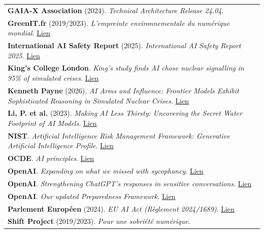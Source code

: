 \documentclass[
  10pt,
  a4paper,
  DIV=11,
  numbers=noendperiod,
  oneside]{scrreprt}
\let\oldtextbf\textbf
\renewcommand{\textbf}[1]{\oldtextbf{\textcolor{cmmnavy}{#1}}}
\let\oldemph\emph
\renewcommand{\emph}[1]{\oldemph{\textcolor{cmmgray}{#1}}}
\begin{document}
{\begin{longtable}[]{@{}
  >{\raggedright\arraybackslash}p{}@{}}
\textbf{GAIA-X Association} (2024). \emph{Technical Architecture Release
24.04}. \\
\textbf{GreenIT.fr} (2019/2023). \emph{L'empreinte environnementale du
numérique mondial}.
\href{https://www.greenit.fr/etude-empreinte-environnementale-du-numerique-mondial/}{Lien} \\
\textbf{International AI Safety Report} (2025). \emph{International AI
Safety Report 2025}.
\href{https://internationalaisafetyreport.org/publication/international-ai-safety-report-2025}{Lien} \\
\textbf{King's College London}. \emph{King's study finds AI chose
nuclear signalling in 95\% of simulated crises}.
\href{https://www.kcl.ac.uk/news/artificial-intelligence-under-nuclear-pressure-first-large-scale-kings-study-reveals-how-ai-models-reason-and-escalate-under-crisis}{Lien} \\
\textbf{Kenneth Payne} (2026). \emph{AI Arms and Influence: Frontier
Models Exhibit Sophisticated Reasoning in Simulated Nuclear Crises}.
\href{https://arxiv.org/abs/2602.14740}{Lien} \\
\textbf{Li, P. et al.} (2023). \emph{Making AI Less Thirsty: Uncovering
the Secret Water Footprint of AI Models}.
\href{https://arxiv.org/abs/2304.03271}{Lien} \\
\textbf{NIST}. \emph{Artificial Intelligence Risk Management Framework:
Generative Artificial Intelligence Profile}.
\href{https://www.nist.gov/publications/artificial-intelligence-risk-management-framework-generative-artificial-intelligence}{Lien} \\
\textbf{OCDE}. \emph{AI principles}.
\href{https://www.oecd.org/en/topics/ai-principles.html}{Lien} \\
\textbf{OpenAI}. \emph{Expanding on what we missed with sycophancy}.
\href{https://openai.com/index/expanding-on-sycophancy/}{Lien} \\
\textbf{OpenAI}. \emph{Strengthening ChatGPT's responses in sensitive
conversations}.
\href{https://openai.com/index/strengthening-chatgpt-responses-in-sensitive-conversations/}{Lien} \\
\textbf{OpenAI}. \emph{Our updated Preparedness Framework}.
\href{https://openai.com/index/updating-our-preparedness-framework/}{Lien} \\
\textbf{Parlement Européen} (2024). \emph{EU AI Act (Règlement
2024/1689)}.
\href{https://eur-lex.europa.eu/legal-content/FR/TXT/?uri=CELEX:32024R1689}{Lien} \\
\textbf{Shift Project} (2019/2023). \emph{Pour une sobriété numérique}.

\end{longtable}}
\end{document}
